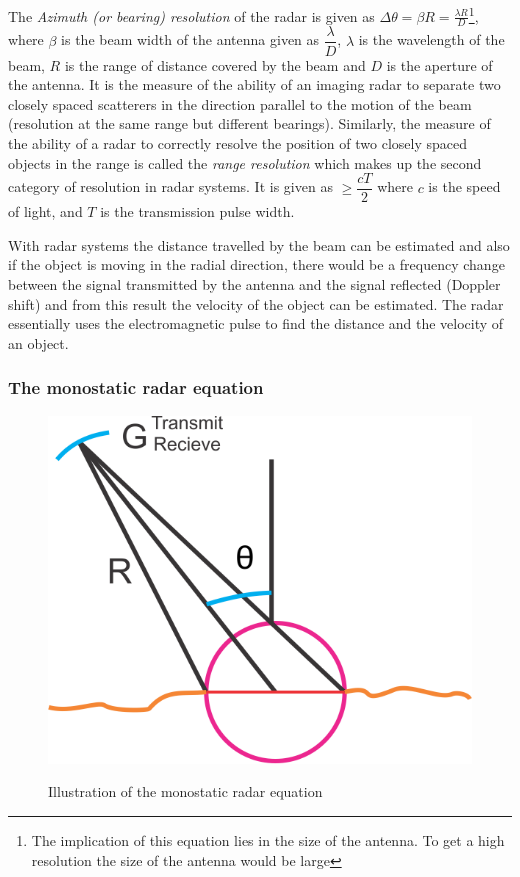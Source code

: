 The \textit{Azimuth (or bearing) resolution} of the radar is given as $\Delta \theta = \beta R = \frac{\lambda R}{D}$\footnote{The implication of this equation lies in the size of the antenna. To get a high resolution the size of the antenna would be large}, where $\beta$ is the beam width of the antenna given as $\dfrac{\lambda}{D}$, $\lambda$ is the wavelength of the beam, $R$ is the range of distance covered by the beam and $D$ is the aperture of the antenna. It is the measure of the ability of an imaging radar to separate two closely spaced scatterers in the direction parallel to the motion of the beam (resolution at the same range but different bearings). Similarly, the measure of the ability of a radar to correctly resolve the position of two closely spaced objects in the range is called the \textit{range resolution} which makes up the second category of resolution in radar systems. It is given as $\geq \dfrac{cT}{2}$ where $c$ is the speed of light, and $T$ is the transmission pulse width.

With radar systems the distance travelled by the beam can be estimated and also if the object is moving in the radial direction, there would be a frequency change between the signal transmitted by the antenna and the signal reflected (Doppler shift) and from this result the velocity of the object can be estimated. The radar essentially uses the electromagnetic pulse to find the distance and the velocity of an object.

\subsubsection*{The monostatic radar equation}
\begin{figure}[h]
\centering
\includegraphics[width=.8\linewidth]{./graphics/new1}
\label{fig:new1}
\caption{Illustration of the monostatic radar equation}
\end{figure}

